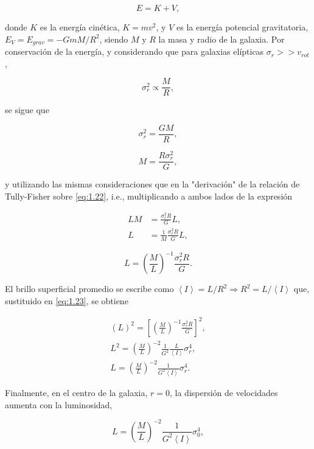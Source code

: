 \documentclass[paper=a4, fontsize=10pt]{scrartcl} %
\begin{document}
$$E = K + V,$$

donde $K$ es la energía cinética, $K=m v^2$, y $V$ es la energía potencial gravitatoria, $E_V = E_{grav} = - GmM/R^2$, siendo $M$ y $R$ la masa y radio de la galaxia. Por conservación de la energía, y considerando que para galaxias elípticas $\sigma_r >> v_{rot}$, 

\begin{equation} \label{eq:1.21} 
\sigma_r^2 \propto \frac{M}{R},
\end{equation}

se sigue que 


$$ \sigma_r^2 = \frac{GM}{R},$$

\begin{equation} \label{eq:1.22} 
 M = \frac{R \sigma_r^2}{G},
\end{equation}


y utilizando las mismas consideraciones que en la "derivación" de la relación de Tully-Fisher sobre \eqref{eq:1.22}, i.e., multiplicando a ambos lados de la expresión 

\begin{align*}
L M & = \frac{\sigma_r^2 R}{G} L, \\
L & = \frac{1}{M} \frac{\sigma_r^2 R}{G} L,
 \end{align*} 

\begin{equation} \label{eq:1.23} 
L  = \left(\frac{M}{L} \right)^{-1} \frac{\sigma_r^2 R}{G}.
\end{equation}

El brillo superficial promedio se escribe como $\left< I \right> = L/R^2 \Rightarrow R^2 = L/\left< I \right>$ que, sustituido en \eqref{eq:1.23}, se obtiene

\begin{align*}
(L)^2 = \left[\left(\frac{M}{L} \right)^{-1} \frac{\sigma_r^2 R}{G} \right]^2, \\
L^2 = \left(\frac{M}{L} \right)^{-2} \frac{1}{G^2} \frac{L}{\left< I \right>} \sigma_r^4, \\
L = \left(\frac{M}{L} \right)^{-2}  \frac{1}{G^2 \left< I \right>} \sigma_r^4.
\end{align*} 

Finalmente, en el centro de la galaxia, $r=0$, la dispersión de velocidades aumenta con la luminosidad,

\begin{equation} \label{eq:1.24} 
L = \left(\frac{M}{L} \right)^{-2}  \frac{1}{G^2 \left< I \right>} \sigma_0^4,
\end{equation}
\end{document}
